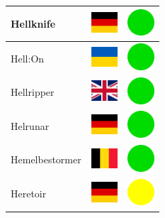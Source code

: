 \documentclass[12pt, a4paper, twoside]{report}
\begin{document}
\begin{center}
\begin{longtable}{|p{5cm}|p{2cm}|p{2cm}|}
Hellknife & \includegraphics[width=1cm]{4x3/de} & \includegraphics[width=1cm]{likes/y} \\ \hline
Hell:On & \includegraphics[width=1cm]{4x3/ua} & \includegraphics[width=1cm]{likes/y} \\ \hline
Hellripper & \includegraphics[width=1cm]{4x3/gb} & \includegraphics[width=1cm]{likes/y} \\ \hline
Helrunar & \includegraphics[width=1cm]{4x3/de} & \includegraphics[width=1cm]{likes/y} \\ \hline
Hemelbestormer & \includegraphics[width=1cm]{4x3/be} & \includegraphics[width=1cm]{likes/y} \\ \hline
Heretoir & \includegraphics[width=1cm]{4x3/de} & \includegraphics[width=1cm]{likes/m} \\ \hline

\end{longtable}
\end{center}
\end{document}
